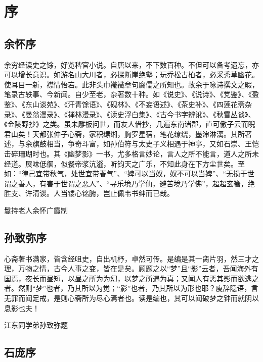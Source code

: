 \chapter*{序}

\section{余怀序}

余穷经读史之馀，好览稗官小说。自唐以来，不下数百种。不但可以备考遗忘，亦可以增长意识。如游名山大川者，必探断崖绝壑；玩乔松古柏者，必采秀草幽花。使耳目一新，襟情怡宕。此非头巾褦襶章句腐儒之所知也。故余于咏诗撰文之暇，笔录古轶事、今新闻。自少至老，杂著数十种。如《说史》、《说诗》、《党鉴》、《盈鉴》、《东山谈苑》、《汗青馀语》、《砚林》、《不妄语述》、《茶史补》、《四莲花斋杂录》、《曼翁漫录》、《禅林漫录》、《读史浮白集》、《古今书字辨讹》、《秋雪丛谈》、《金陵野抄》之类。虽未雕板问世，而友人借抄，几遍东南诸郡，直可傲子云而睨君山矣！天都张仲子心斋，家积缥缃，胸罗星宿，笔花缭绕，墨渖淋漓。其所著述，与余旗鼓相当，争奇斗富，如孙伯符与太史子义相遇于神亭，又如石崇、王恺击碎珊瑚时也。其《幽梦影》一书，尤多格言妙论，言人之所不能言，道人之所未经道。展味低徊，似餐帝浆沆瀣，听钧天之广乐，不知此身在下方尘世矣。至如：“律己宜带秋气，处世宜带春气”、“婢可以当奴，奴不可以当婢”、“无损于世谓之善人，有害于世谓之恶人”、“寻乐境乃学仙，避苦境乃学佛”，超超玄箸，绝胜支、许清谈。人当镂心铭腑，岂止佩韦书绅而已哉。



鬘持老人余怀广霞制


\section{孙致弥序}

心斋著书满家，皆含经咀史，自出机杼，卓然可传。是编是其一脔片羽，然三才之理，万物之情，古今人事之变，皆在是矣。顾题之以“梦”且“影”云者，吾闻海外有国焉，夜长而昼短，以昼之所为为幻，以梦之所遇为真；又闻人有恶其影而欲逃之者。然则“梦”也者，乃其所以为觉；“影”也者，乃其所以为形也耶？廋辞隐语，言无罪而闻足戒，是则心斋所为尽心焉者也。读是编也，其可以闻破梦之钟而就阴以息影也夫！



江东同学弟孙致弥题


\section{石庞序}

